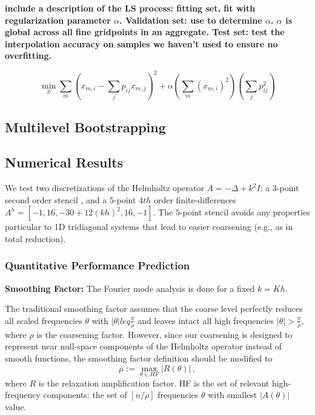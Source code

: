 \documentclass{article}
\begin{document}
{\bf include a description of the LS process: fitting set, fit with regularization parameter $\alpha$. Validation set: use to determine $\alpha$. $\alpha$ is global across all fine gridpoints in an aggregate. Test set: test the interpolation accuracy on samples we haven't used to ensure no overfitting.
}

\begin{equation}
	\min_p \sum_m \left( x_{m,i} - \sum_j p_{ij} x_{m,j} \right)^2 + \alpha \left( \sum_m (x_{m,i})^2 \right) \left(\sum_j p_{ij}^2\right) 
\end{equation}

\subsection{Multilevel Bootstrapping}

\subsection{Numerical Results}
We test two discretizations of the Helmholtz operator $A = -\Delta + k^2 I$: a $3$-point second order stencil , and a $5$-point $4th$ order finite-differences $A^h = [-1, 16, -30 + 12 (kh)^2, 16, -1]$. The $5$-point stencil avoids any properties particular to 1D tridiagonal systems that lead to easier coarsening (e.g., as in total reduction).

\subsubsection{Quantitative Performance Prediction}

{\bf Smoothing Factor:} The Fourier mode analysis is done for a fixed $k = K h$.

The traditional smoothing factor \cite[Sec. ??]{guide} assumes that the coarse level perfectly reduces all scaled frequencies $\theta$ with $|\theta| leq \frac{\pi}{\rho}$ and leaves intact all high frequencies $|\theta| > \frac{\pi}{\rho}$, where $\rho$ is the coarsening factor. However, since our coarsening is designed to represent near null-space components of the Helmholtz operator instead of smooth functions, the smoothing factor definition should be modified to
\begin{equation}
	\overline{\mu} := \max_{\theta \in HF} \left| R(\theta) \right|\,,
\end{equation}
where $R$ is the relaxation amplification factor. HF is the set of relevant high-frequency components: the set of $[n/\rho]$ frequencies $\theta$ with smallest $|A(\theta)|$ value.
\end{document}
